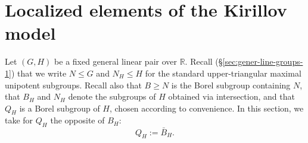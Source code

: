 \section{Localized elements of the Kirillov model}\label{sec:asympt-analys-local}
Let $(G,H)$ be a fixed general linear pair over $\mathbb{R}$.  Recall (\S\ref{sec:gener-line-groups-1}) that we write $N \leq G$ and $N_H \leq H$ for the standard upper-triangular maximal unipotent subgroups.  Recall also that $B \geq N$ is the Borel subgroup containing $N$, that $B_H$ and $N_H$ denote the subgroups of $H$ obtained via intersection, and that $Q_H$ is a Borel subgroup of $H$, chosen according to convenience.  In this section, we take for $Q_H$ the opposite of $B_H$:
\begin{equation*}
  Q_H := \bar{B}_H.
\end{equation*}

